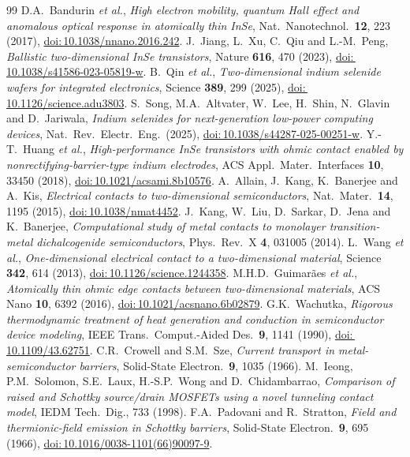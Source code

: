 \documentclass[11pt]{article}
\providecommand{\doi}[1]{\href{https://doi.org/#1}{doi:\,#1}}
\begin{document}
\begin{thebibliography}{99}
 D.A.~Bandurin \textit{et al.}, \textit{High electron mobility, quantum Hall effect and anomalous optical response in atomically thin InSe}, Nat.\ Nanotechnol.\ \textbf{12}, 223 (2017), \doi{10.1038/nnano.2016.242}.
 J.~Jiang, L.~Xu, C.~Qiu and L.-M.~Peng, \textit{Ballistic two-dimensional InSe transistors}, Nature \textbf{616}, 470 (2023), \doi{10.1038/s41586-023-05819-w}.
 B.~Qin \textit{et al.}, \textit{Two-dimensional indium selenide wafers for integrated electronics}, Science \textbf{389}, 299 (2025), \doi{10.1126/science.adu3803}.
 S.~Song, M.A.~Altvater, W.~Lee, H.~Shin, N.~Glavin and D.~Jariwala, \textit{Indium selenides for next-generation low-power computing devices}, Nat.\ Rev.\ Electr.\ Eng.\ (2025), \doi{10.1038/s44287-025-00251-w}.
 Y.-T.~Huang \textit{et al.}, \textit{High-performance InSe transistors with ohmic contact enabled by nonrectifying-barrier-type indium electrodes}, ACS Appl.\ Mater.\ Interfaces \textbf{10}, 33450 (2018), \doi{10.1021/acsami.8b10576}.
 A.~Allain, J.~Kang, K.~Banerjee and A.~Kis, \textit{Electrical contacts to two-dimensional semiconductors}, Nat.\ Mater.\ \textbf{14}, 1195 (2015), \doi{10.1038/nmat4452}.
 J.~Kang, W.~Liu, D.~Sarkar, D.~Jena and K.~Banerjee, \textit{Computational study of metal contacts to monolayer transition-metal dichalcogenide semiconductors}, Phys.\ Rev.\ X \textbf{4}, 031005 (2014).
 L.~Wang \textit{et al.}, \textit{One-dimensional electrical contact to a two-dimensional material}, Science \textbf{342}, 614 (2013), \doi{10.1126/science.1244358}.
 M.H.D.~Guimar\~aes \textit{et al.}, \textit{Atomically thin ohmic edge contacts between two-dimensional materials}, ACS Nano \textbf{10}, 6392 (2016), \doi{10.1021/acsnano.6b02879}.
 G.K.~Wachutka, \textit{Rigorous thermodynamic treatment of heat generation and conduction in semiconductor device modeling}, IEEE Trans.\ Comput.-Aided Des.\ \textbf{9}, 1141 (1990), \doi{10.1109/43.62751}.
 C.R.~Crowell and S.M.~Sze, \textit{Current transport in metal-semiconductor barriers}, Solid-State Electron.\ \textbf{9}, 1035 (1966).
 M.~Ieong, P.M.~Solomon, S.E.~Laux, H.-S.P.~Wong and D.~Chidambarrao, \textit{Comparison of raised and Schottky source/drain MOSFETs using a novel tunneling contact model}, IEDM Tech.\ Dig., 733 (1998).
 F.A.~Padovani and R.~Stratton, \textit{Field and thermionic-field emission in Schottky barriers}, Solid-State Electron.\ \textbf{9}, 695 (1966), \doi{10.1016/0038-1101(66)90097-9}.

\end{thebibliography}
\end{document}
